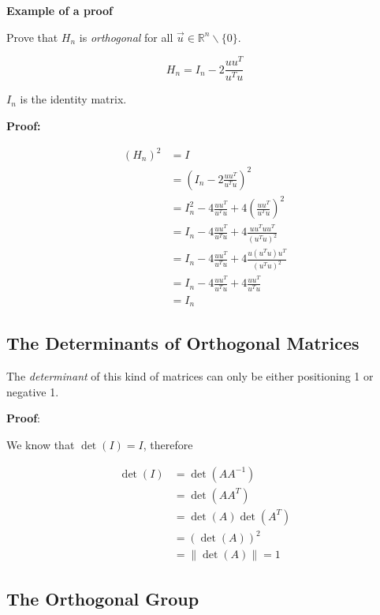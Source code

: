 \textbf{Example of a proof}
\vspace{\baselineskip}

Prove that \(H_n\) is \emph{orthogonal} for all \(\vec{u}\in \mathbb{R}^n \backslash \{0\} \).

\[
H_n = I_n - 2 \frac{uu^T}{u^Tu}
\]

\(I_n\) is the identity matrix.
\vspace{\baselineskip}

\textbf{Proof:}

\begin{align*}
(H_n)^2 &= I \\
&= \left(I_n - 2 \frac{uu^T}{u^Tu}\right)^2\\
&= I_n^2 - 4\frac{uu^T}{u^Tu} + 4\left(\frac{uu^T}{u^Tu}\right)^2\\
&= I_n -4\frac{uu^T}{u^Tu} +4\frac{uu^T uu^T}{(u^Tu)^2}\\ 
&= I_n -4\frac{uu^T}{u^Tu} +4\frac{u(u^T u)u^T}{(u^Tu)^2}\\ 
&= I_n -4\frac{uu^T}{u^Tu} +4\frac{uu^T}{u^Tu}\\ 
&= I_n
\end{align*}

\QED

\subsection{The Determinants of Orthogonal Matrices}

The \emph{determinant} of this kind of matrices can only be either positioning 1 or negative 1.
\vspace{\baselineskip}

\textbf{Proof}:

We know that \(\det(I) = I \), therefore

\begin{align*}
    \det(I) &= \det(A A^{-1}) \\
            &= \det(A A^T) \\
            &= \det(A) \det(A^T) \\
            &= (\det(A))^2 \\
            &= \|\det (A) \| = 1
\end{align*}

\QED

\subsection{The Orthogonal Group}

